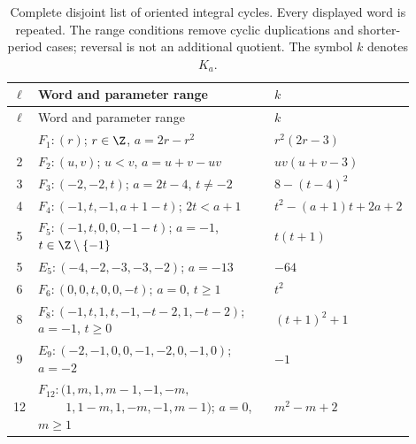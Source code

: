 \begingroup
\small
\setlength{\tabcolsep}{4pt}
\begin{longtable}{@{}c p{0.62\linewidth} p{0.28\linewidth}@{}}
\caption{Complete disjoint list of oriented integral cycles.
Every displayed word is repeated. The range conditions remove
cyclic duplications and shorter-period cases; reversal is not
an additional quotient. The symbol $k$ denotes $K_a$.}
\label{tab:classification}\\
\toprule
$\ell$ & Word and parameter range & $k$ \\
\midrule
\endfirsthead
\toprule
$\ell$ & Word and parameter range & $k$ \\
\midrule
\endhead
\bottomrule
\endfoot
1 & $F_1:(r)$; $r\in\Z$, $a=2r-r^2$ & $r^2(2r-3)$ \\
2 & $F_2:(u,v)$; $u<v$, $a=u+v-uv$ & $uv(u+v-3)$ \\
3 & $F_3:(-2,-2,t)$; $a=2t-4$, $t\ne-2$ & $8-(t-4)^2$ \\
4 & $F_4:(-1,t,-1,a+1-t)$; $2t<a+1$ & $t^2-(a+1)t+2a+2$ \\
5 & $F_5:(-1,t,0,0,-1-t)$; $a=-1$, $t\in\Z\setminus\{-1\}$ & $t(t+1)$ \\
5 & $E_5:(-4,-2,-3,-3,-2)$; $a=-13$ & $-64$ \\
6 & $F_6:(0,0,t,0,0,-t)$; $a=0$, $t\ge1$ & $t^2$ \\
8 & $F_8:(-1,t,1,t,-1,-t-2,1,-t-2)$;
 $a=-1$, $t\ge0$ & $(t+1)^2+1$ \\
9 & $E_9:(-2,-1,0,0,-1,-2,0,-1,0)$; $a=-2$ & $-1$ \\
12 & $F_{12}:(1,m,1,m-1,-1,-m,$\newline
 $\phantom{F_{12}:(}1,1-m,1,-m,-1,m-1)$;
 $a=0$, $m\ge1$ & $m^2-m+2$ \\
\end{longtable}
\endgroup
